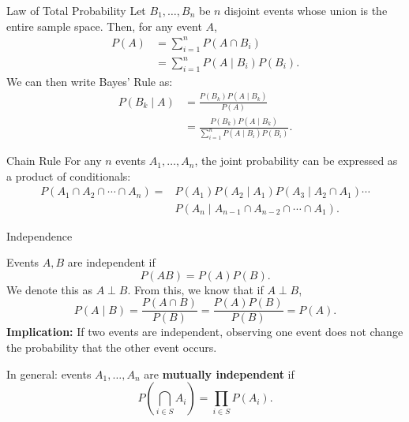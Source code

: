 \documentclass[aspectratio=169,12pt]{beamer}
\begin{document}
\begin{frame}[t]{Law of Total Probability}
  \vspace{-0.10cm}
  {\scriptsize
  Let $B_1,\ldots,B_n$ be $n$ disjoint events whose union is the entire sample
  space. Then, for any event $A$,
  \[
  \begin{aligned}
    P(A)&=\sum_{i=1}^{n}P(A\cap B_i)\\
        &=\sum_{i=1}^{n}P(A\mid B_i)P(B_i).
  \end{aligned}
  \]
  We can then write Bayes' Rule as:
  \[
  \begin{aligned}
    P(B_k\mid A)
      &=\frac{P(B_k)P(A\mid B_k)}{P(A)}\\
      &=\boxed{\frac{P(B_k)P(A\mid B_k)}
        {\sum_{i=1}^{n}P(A\mid B_i)P(B_i)}}.
  \end{aligned}
  \]
  }
\end{frame}

\begin{frame}[t]{Chain Rule}
  \vspace{1.05cm}
  {\large
  For any $n$ events $A_1,\ldots,A_n$, the joint probability can be expressed as
  a product of conditionals:
  \[
  \begin{aligned}
  P(A_1\cap A_2\cap\cdots\cap A_n)
  ={}&P(A_1)P(A_2\mid A_1)P(A_3\mid A_2\cap A_1)\cdots\\
     &P(A_n\mid A_{n-1}\cap A_{n-2}\cap\cdots\cap A_1).
  \end{aligned}
  \]
  }
\end{frame}

\begin{frame}[t]{Independence}
  \vspace{0.05cm}
  {\scriptsize
  Events $A,B$ are independent if
  \[
    P(AB)=P(A)P(B).
  \]
  We denote this as $A\perp B$. From this, we know that if $A\perp B$,
  \[
    P(A\mid B)=\frac{P(A\cap B)}{P(B)}
      =\frac{P(A)P(B)}{P(B)}=P(A).
  \]
  \textbf{Implication:} If two events are independent, observing one event does
  not change the probability that the other event occurs.

  In general: events $A_1,\ldots,A_n$ are \textbf{mutually independent} if
  \[
    P\left(\bigcap_{i\in S}A_i\right)=\prod_{i\in S}P(A_i).
  \]
  }
\end{frame}
\end{document}
